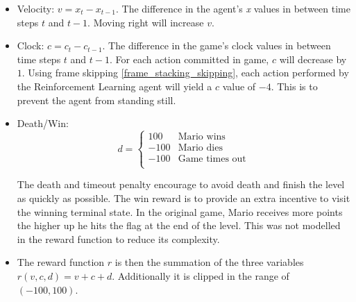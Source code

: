 \documentclass[notitlepage,a4paper,11pt]{article}
\begin{document}
\begin{itemize}

	\item Velocity: $v = x_t - x_{t-1}$. The difference in the agent's \textit{x} values in between time steps $t$ and $t - 1$. Moving right will increase $v$.
	
	\item Clock: $c = c_t - c_{t-1}$. The difference in the game's clock values in between time steps $t$ and $t - 1$. For each action committed in game, $c$ will decrease by $1$. Using frame skipping \ref{frame_stacking_skipping}, each action performed by the Reinforcement Learning agent will yield a $c$ value of $-4$. This is to prevent the agent from standing still.
	
	\item Death/Win: 
		\begin{equation*}
   	 		d = \begin{cases}
               			100               & \text{Mario wins}\\
               			-100              & \text{Mario dies}\\
               			-100				 & \text{Game times out}\\
           			\end{cases}
		\end{equation*}
		
		The death and timeout penalty encourage to avoid death and finish the level as quickly as possible. The win reward is to provide an extra incentive to visit the winning terminal state. In the original game, Mario receives more points the higher up he hits the flag at the end of the level. This was not modelled in the reward function to reduce its complexity.
		
	\item The reward function $r$ is then the summation of the three variables $r(v, c, d) = v + c + d$. Additionally it is clipped in the range of $(-100, 100)$.
	
	
\end{itemize}
\end{document}
